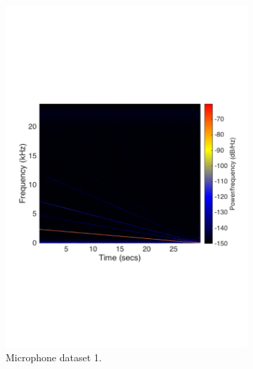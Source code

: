 \begin{figure}[H]
\centering
\begin{subfigure}[t]{0.47\textwidth}
	\includegraphics[width=1\textwidth]{figures/spectrogram_mic1.pdf}
	\caption{Microphone dataset 1.}
	\label{fig:spectrogram_mic1}
\end{subfigure}
\begin{subfigure}[t]{0.47\textwidth}

\end{subfigure}
\end{figure}
